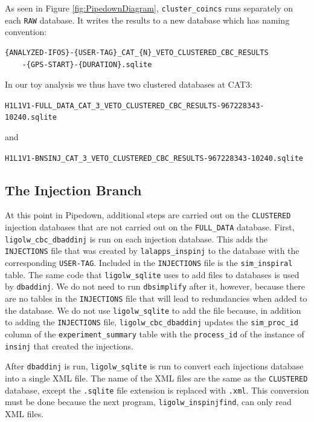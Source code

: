 As seen in Figure \ref{fig:PipedownDiagram}, \verb|cluster_coincs| runs
separately on each \verb|RAW| database. It writes the results to a new database
which has naming convention:
\begin{center}
\begin{verbatim}
{ANALYZED-IFOS}-{USER-TAG}_CAT_{N}_VETO_CLUSTERED_CBC_RESULTS
    -{GPS-START}-{DURATION}.sqlite
\end{verbatim}
\end{center}
In our toy analysis we thus have two clustered databases at CAT3:
\begin{footnotesize}
\begin{center}
\verb|H1L1V1-FULL_DATA_CAT_3_VETO_CLUSTERED_CBC_RESULTS-967228343-10240.sqlite|
\end{center}
\end{footnotesize}
and
\begin{center}
\begin{footnotesize}
\verb|H1L1V1-BNSINJ_CAT_3_VETO_CLUSTERED_CBC_RESULTS-967228343-10240.sqlite|
\end{footnotesize}
\end{center}

\subsection{The Injection Branch}
\label{sec:Pipedown-injBranch}

At this point in Pipedown, additional steps are carried out on the
\verb|CLUSTERED| injection databases that are not carried out on the
\verb|FULL_DATA| database. First, \\ \verb|ligolw_cbc_dbaddinj| is run on each
injection database. This adds the \verb|INJECTIONS| file that was created by
\verb|lalapps_inspinj| to the database with the corresponding \verb|USER-TAG|.
Included in the \verb|INJECTIONS| file is the \verb|sim_inspiral| table. The
same code that \verb|ligolw_sqlite| uses to add files to databases is used by
\verb|dbaddinj|. We do not need to run \verb|dbsimplify| after it, however,
because there are no tables in the \verb|INJECTIONS| file that will lead to
redundancies when added to the database. We do not use \verb|ligolw_sqlite| to
add the file because, in addition to adding the \verb|INJECTIONS| file,
\verb|ligolw_cbc_dbaddinj| updates the \verb|sim_proc_id| column of the
\verb|experiment_summary| table with the \verb|process_id| of the instance of
\verb|insinj| that created the injections.

After \verb|dbaddinj| is run, \verb|ligolw_sqlite| is run to convert each
injections database into a single XML file. The name of the XML files are the
same as the \verb|CLUSTERED| database, except the \verb|.sqlite| file extension
is replaced with \verb|.xml|. This conversion must be done because the next
program, \verb|ligolw_inspinjfind|, can only read XML files.

